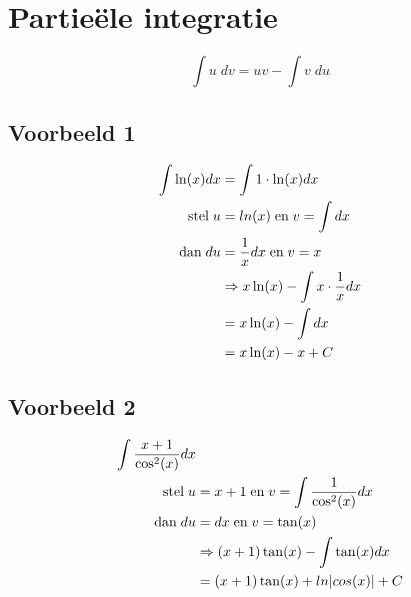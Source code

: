 \documentclass[12pt]{report}
\begin{document}
\section{Partieële integratie}
$$\int u\;dv = uv - \int v\;du$$
\subsection{Voorbeeld 1}
\begin{equation*}
    \begin{split}
        \int \ln(x) dx & = \int 1\cdot \ln(x) dx \\
        \hbox{stel}\; u & = ln(x) \; \hbox{en}\; v = \int dx\\
        \hbox{dan}\; du & = \frac{1}{x}dx \; \hbox{en}\; v = x\\
        & \Rightarrow x\ln(x) - \int x\cdot\frac{1}{x}dx\\
        & = x\ln(x) - \int dx\\
        & = x\ln(x) - x + C
    \end{split}
\end{equation*}
\subsection{Voorbeeld 2}
\begin{equation*}
    \begin{split}
        \int \frac{x + 1}{\cos^2(x)}dx & \\
        \hbox{stel}\; u & = x + 1 \; \hbox{en}\; v = \int \frac{1}{\cos^2(x)}dx\\
        \hbox{dan}\; du & = dx \; \hbox{en}\; v = \tan(x) \\
        & \Rightarrow (x+1)\tan(x) - \int \tan(x)dx  \\
        & = (x+1)\tan(x) + ln|cos(x)| + C  \\
    \end{split}
\end{equation*}
\end{document}

